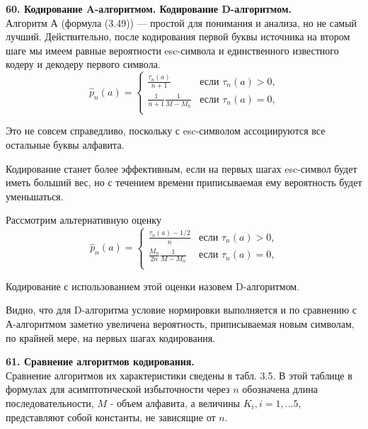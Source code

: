 \documentclass[14pt]{article}
\begin{document}
\bigskip
\textbf{60. Кодирование A-алгоритмом. Кодирование D-алгоритмом.} \\


Алгоритм А (формула (3.49)) — простой для понимания и анализа, но не самый лучший. Действительно, после кодирования первой буквы источника на втором шаге мы имеем равные вероятности esc-символа и единственного известного кодеру и декодеру первого символа.
\begin{displaymath}
    \hat{p}_n(a) = \left\{ \begin{array}{ll}
        \frac{\tau_n(a)}{n + 1} & \textrm{если \(\tau_n(a) > 0\),}\\
        \frac{1}{n + 1}\frac{1}{M - M_n} & \textrm{если \(\tau_n(a) = 0\),}\\
  \end{array} \right.
\end{displaymath}

Это не совсем справедливо, поскольку с esc-символом ассоциируются все остальные буквы алфавита.

Кодирование станет более эффективным, если на первых шагах esc-символ будет иметь больший вес, но с течением времени приписываемая ему вероятность будет уменьшаться.

Рассмотрим альтернативную оценку
\begin{displaymath}
    \hat{p}_n(a) = \left\{ \begin{array}{ll}
        \frac{\tau_n(a) - 1/2}{n} & \textrm{если \(\tau_n(a) > 0\),}\\
        \frac{M_n}{2n}\frac{1}{M - M_n} & \textrm{если \(\tau_n(a) = 0\),}\\
  \end{array} \right.
\end{displaymath}

Кодирование с использованием этой оценки назовем D-алгоритмом.

Видно, что для D-алгоритма условие нормировки выполняется и по сравнению с А-алгоритмом заметно увеличена вероятность, приписываемая новым символам, по крайней мере, на первых шагах кодирования.


\bigskip
\textbf{61. Сравнение алгоритмов кодирования.} \\

Сравнение алгоритмов их характеристики сведены в табл. 3.5. В этой таблице в формулах для асимптотической избыточности через \(n\) обозначена длина последовательности, \(M\) - объем алфавита, а величины \(K_i, i = 1,...5,\) представляют собой константы, не зависящие от \(n\).
\end{document}
